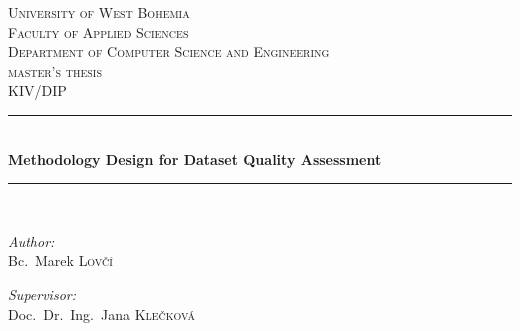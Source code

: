 \linespread{1}

\begin{titlepage}

    \newcommand{\HRule}{\rule{\linewidth}{0.5mm}} %

    \center{} %


    \textsc{\LARGE University of West Bohemia}\\[.5cm] %
    \textsc{\Large Faculty of Applied Sciences}\\[.5cm] %
    \textsc{\Large Department of Computer Science and Engineering}\\[1.5cm] %

    \textsc{\Large master's thesis}\\[0.5cm] %
    \textsc{\large KIV/DIP}\\[0.5cm] %


    \HRule{} \\[0.4cm]
    {\huge \bfseries Methodology Design for Dataset Quality Assessment}\\ %
    \HRule{} \\[1.5cm]


    \begin{minipage}[t]{0.4\textwidth}
        \begin{flushleft}
            \large \emph{Author:}\\
            Bc.\ Marek \textsc{Lovčí}
        \end{flushleft}
    \end{minipage}
    \begin{minipage}[t]{0.4\textwidth}
        \begin{flushright}
            \large \emph{Supervisor:}\\
            Doc.\ Dr.\ Ing.\ Jana \textsc{Klečková}
        \end{flushright}
    \end{minipage}\\[7.5cm] %


\end{titlepage}
